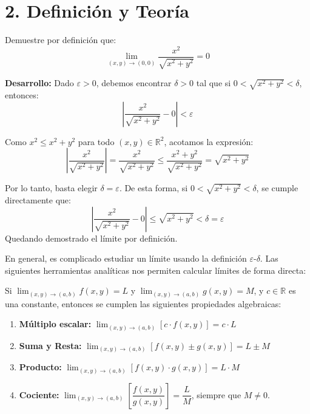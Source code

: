 \documentclass[11pt]{article}
\newenvironment{teoria}{%
  \section*{2. Definición y Teoría}%
}{}
\newenvironment{teorema}[1]{%
  \begin{tcolorbox}[colback=green!5,colframe=green!75!black,title=Teorema: #1]%
}{%
  \end{tcolorbox}%
}
\newenvironment{ejemplo}[1]{%
  \begin{tcolorbox}[colback=white,colframe=gray!40,title=Ejemplo: #1]%
}{%
  \end{tcolorbox}%
}
\begin{document}
\begin{teoria}
  \begin{ejemplo}{Cálculo de Límite por Definición $\varepsilon$-$\delta$}
    Demuestre por definición que:
    $$ \lim_{(x,y) \to (0,0)} \dfrac{x^2}{\sqrt{x^2 + y^2}} = 0 $$
    
    \textbf{Desarrollo:}
    Dado $\varepsilon > 0$, debemos encontrar $\delta > 0$ tal que si $0 < \sqrt{x^2 + y^2} < \delta$, entonces:
    $$ \left| \dfrac{x^2}{\sqrt{x^2 + y^2}} - 0 \right| < \varepsilon $$
    
    Como $x^2 \leq x^2 + y^2$ para todo $(x,y) \in \mathbb{R}^2$, acotamos la expresión:
    $$ \left| \dfrac{x^2}{\sqrt{x^2 + y^2}} \right| = \dfrac{x^2}{\sqrt{x^2 + y^2}} \leq \dfrac{x^2 + y^2}{\sqrt{x^2 + y^2}} = \sqrt{x^2 + y^2} $$
    
    Por lo tanto, basta elegir $\delta = \varepsilon$. De esta forma, si $0 < \sqrt{x^2 + y^2} < \delta$, se cumple directamente que:
    $$ \left| \dfrac{x^2}{\sqrt{x^2 + y^2}} - 0 \right| \leq \sqrt{x^2 + y^2} < \delta = \varepsilon $$
    Quedando demostrado el límite por definición.
  \end{ejemplo}

  En general, es complicado estudiar un límite usando la definición $\varepsilon$-$\delta$. Las siguientes herramientas analíticas nos permiten calcular límites de forma directa:

  \begin{teorema}{Álgebra de Límites}
    Si $\displaystyle \lim_{(x,y) \to (a,b)} f(x,y) = L$ y $\displaystyle \lim_{(x,y) \to (a,b)} g(x,y) = M$, y $c \in \mathbb{R}$ es una constante, entonces se cumplen las siguientes propiedades algebraicas:
    \begin{enumerate}
      \item \textbf{Múltiplo escalar:} $\displaystyle \lim_{(x,y) \to (a,b)} [c \cdot f(x,y)] = c \cdot L$
      \item \textbf{Suma y Resta:} $\displaystyle \lim_{(x,y) \to (a,b)} [f(x,y) \pm g(x,y)] = L \pm M$
      \item \textbf{Producto:} $\displaystyle \lim_{(x,y) \to (a,b)} [f(x,y) \cdot g(x,y)] = L \cdot M$
      \item \textbf{Cociente:} $\displaystyle \lim_{(x,y) \to (a,b)} \left[ \dfrac{f(x,y)}{g(x,y)} \right] = \dfrac{L}{M}$, siempre que $M \neq 0$.
    \end{enumerate}
  \end{teorema}


\end{teoria}
\end{document}
